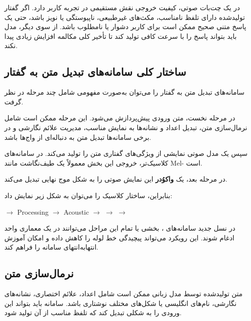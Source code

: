 در یک چت‌بات صوتی، کیفیت خروجی  نقش مستقیمی در تجربه
کاربر دارد.
اگر گفتار تولیدشده دارای تلفظ نامناسب، مکث‌های غیرطبیعی،
ناپیوستگی یا نویز باشد، حتی یک پاسخ متنی صحیح ممکن است برای
کاربر دشوار یا نامطلوب باشد.
از سوی دیگر، مدل باید بتواند پاسخ را با سرعت کافی تولید کند
تا تأخیر کلی مکالمه افزایش زیادی پیدا نکند.


\subsection{ساختار کلی سامانه‌های تبدیل متن به گفتار}

سامانه‌های تبدیل متن به گفتار را می‌توان به‌صورت مفهومی شامل
چند مرحله در نظر گرفت.

در مرحله نخست، متن ورودی پیش‌پردازش می‌شود.
این مرحله ممکن است شامل نرمال‌سازی متن، تبدیل اعداد و نشانه‌ها
به نمایش مناسب، مدیریت علائم نگارشی و در برخی سامانه‌ها تبدیل
متن به دنباله‌ای از واج‌ها
باشد.

سپس یک مدل صوتی
نمایشی از ویژگی‌های گفتاری متن را تولید می‌کند.
در سامانه‌های کلاسیک‌تر، خروجی این بخش معمولاً یک طیف‌نگاشت
مانند Mel- است.

در مرحله بعد، یک
\textbf{واکوُدر}
این نمایش صوتی را به شکل موج نهایی تبدیل می‌کند.

بنابراین، ساختار کلاسیک را می‌توان به شکل زیر نمایش داد:

\begin{center}
$\longrightarrow$
 Processing
$\longrightarrow$
Acoustic 
$\longrightarrow$
$\longrightarrow$
$\longrightarrow$
\end{center}

در نسل جدید سامانه‌های ، بخشی یا تمام این مراحل می‌توانند
در یک معماری واحد ادغام شوند.
این رویکرد می‌تواند پیچیدگی خط لوله را کاهش داده و امکان آموزش
انتهابه‌انتهای سامانه را فراهم کند.


\subsection{نرمال‌سازی متن}

متن تولیدشده توسط مدل زبانی ممکن است شامل اعداد، علائم اختصاری،
نشانه‌های نگارشی، نام‌های انگلیسی یا شکل‌های مختلف نوشتاری باشد.
سامانه  باید بتواند این ورودی را به شکلی تبدیل کند که
تلفظ مناسب از آن تولید شود.

